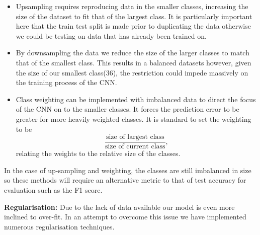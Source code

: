 \documentclass[11pt,a4paper,twoside]{article}
\begin{document}
\begin{itemize}

\item Upsampling requires reproducing data in the smaller classes, increasing the size of the dataset to fit that of the largest class. It is particularly important here that the train test split is made prior to duplicating the data otherwise we could be testing on data that has already been trained on. 

\item By downsampling the data we reduce the size of the larger classes to match that of the smallest class. This results in a balanced datasets however, given the size of our smallest class(36), the restriction could impede massively on the training process of the CNN.

\item Class weighting can be implemented with imbalanced data to direct the focus of the CNN on to the smaller classes. It forces the  prediction error to be greater for more heavily weighted classes. It is standard to set the weighting to be
$$\frac{\text{size of largest class}}{\text{size of current class}},$$
relating the weights to the relative size of the classes.
\end{itemize}

In the case of up-sampling and weighting, the classes are still imbalanced in size so these methods will require an alternative metric to that of test accuracy for evaluation such as the F1 score.

\textbf{Regularisation:} Due to the lack of data available our model is even more inclined to over-fit. In an attempt to overcome this issue we have implemented numerous regularisation techniques.
\end{document}
